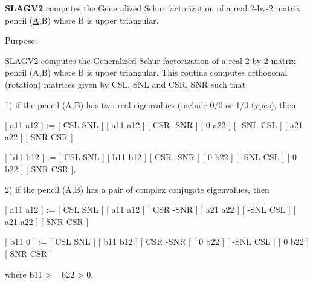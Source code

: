 {\bfseries S\+L\+A\+G\+V2} computes the Generalized Schur factorization of a real 2-\/by-\/2 matrix pencil (\hyperlink{classA}{A},B) where B is upper triangular. 

 \begin{DoxyParagraph}{Purpose\+: }
\begin{DoxyVerb} SLAGV2 computes the Generalized Schur factorization of a real 2-by-2
 matrix pencil (A,B) where B is upper triangular. This routine
 computes orthogonal (rotation) matrices given by CSL, SNL and CSR,
 SNR such that

 1) if the pencil (A,B) has two real eigenvalues (include 0/0 or 1/0
    types), then

    [ a11 a12 ] := [  CSL  SNL ] [ a11 a12 ] [  CSR -SNR ]
    [  0  a22 ]    [ -SNL  CSL ] [ a21 a22 ] [  SNR  CSR ]

    [ b11 b12 ] := [  CSL  SNL ] [ b11 b12 ] [  CSR -SNR ]
    [  0  b22 ]    [ -SNL  CSL ] [  0  b22 ] [  SNR  CSR ],

 2) if the pencil (A,B) has a pair of complex conjugate eigenvalues,
    then

    [ a11 a12 ] := [  CSL  SNL ] [ a11 a12 ] [  CSR -SNR ]
    [ a21 a22 ]    [ -SNL  CSL ] [ a21 a22 ] [  SNR  CSR ]

    [ b11  0  ] := [  CSL  SNL ] [ b11 b12 ] [  CSR -SNR ]
    [  0  b22 ]    [ -SNL  CSL ] [  0  b22 ] [  SNR  CSR ]

    where b11 >= b22 > 0.\end{DoxyVerb}
 
\end{DoxyParagraph}

